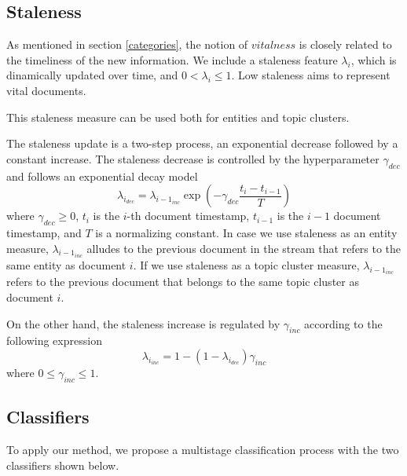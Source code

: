 \documentclass{article}
\begin{document}

\subsection{Staleness}
\label{staleness}

As mentioned in section \ref{categories}, the notion of $vitalness$ is closely related to the timeliness of the new information. We include a staleness feature $\lambda_i$, which is dinamically updated over time, and $0 < \lambda_i \leq 1$. Low staleness aims to represent vital documents.

This staleness measure can be used both for entities and topic clusters.

The staleness update is a two-step process, an exponential decrease followed by a constant increase.
The staleness decrease is controlled by the hyperparameter $\gamma_{dec}$ and follows an exponential decay model
\begin{equation}
\label{decrease}
\lambda_{i_{dec}} = \lambda_{{i-1}_{inc}} \exp{(-\gamma_{dec} \frac{t_i-t_{i-1}}{T})}
\end{equation}
where $\gamma_{dec} \geq 0$, $t_i$ is the $i$-th document timestamp, $t_{i-1}$ is the $i-1$ document timestamp, and $T$ is a normalizing constant.
In case we use staleness as an entity measure, $\lambda_{{i-1}_{inc}}$ alludes to the previous document in the stream that refers to the same entity as document $i$.
If we use staleness as a topic cluster measure, $\lambda_{{i-1}_{inc}}$ refers to the previous document that belongs to the same topic cluster as document $i$.

On the other hand, the staleness increase is regulated by $\gamma_{inc}$ according to the following expression
\begin{equation}
\lambda_{i_{inc}} = 1 - (1 - \lambda_{i_{dec}}) \gamma_{inc}
\end{equation}
where $0 \leq \gamma_{inc} \leq 1$.

\subsection{Classifiers}

To apply our method, we propose a multistage classification process with the two classifiers shown below.
\end{document}
